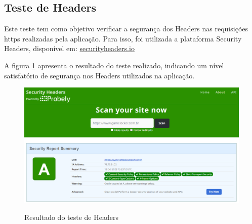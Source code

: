 \subsection{Teste de Headers}
Este teste tem como objetivo verificar a segurança dos \gls{Headers} nas requisições \ac{https} realizadas pela aplicação. Para isso, foi utilizada a plataforma Security Headers, disponível em: \url{securityheaders.io}

A figura \ref{testeHeaders} apresenta o resultado do teste realizado, indicando um nível satisfatório de segurança nos \gls{Headers} utilizados na aplicação.

\begin{figure}[H]
    \center
	\caption{\label{fig_sge20}Resultado do teste de Headers}
    \includegraphics[scale=0.45]{imagens/testes/TESTEHEADERS.png}
    \label{testeHeaders}
\end{figure}